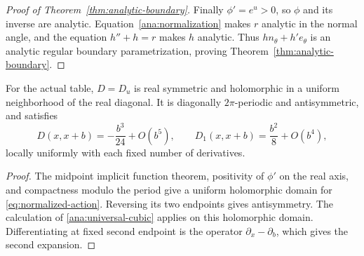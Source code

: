 \begin{proof}[Proof of Theorem~\ref{thm:analytic-boundary}]
Finally \(\phi'=e^u>0\), so \(\phi\) and its inverse are analytic.
Equation~\eqref{ana:normalization} makes \(r\) analytic in the normal
angle, and the equation \(h''+h=r\) makes \(h\) analytic.
Thus \(h n_\theta+h'e_\theta\) is an analytic regular boundary
parametrization, proving Theorem~\ref{thm:analytic-boundary}.
\end{proof}

\begin{corollary}\label{ana:glancing-interface}
For the actual table, \(D=D_u\) is real symmetric and holomorphic
in a uniform neighborhood of the real diagonal.  It is diagonally
\(2\pi\)-periodic and antisymmetric, and satisfies
\begin{equation}\label{ana:glancing-expansion}
 D(x,x+b)=-\frac{b^3}{24}+O(b^5),\qquad
 D_1(x,x+b)=\frac{b^2}{8}+O(b^4),
\end{equation}
locally uniformly with each fixed number of derivatives.
\end{corollary}

\begin{proof}
The midpoint implicit function theorem, positivity of \(\phi'\)
on the real axis, and compactness modulo the period give a uniform
holomorphic domain for \eqref{eq:normalized-action}.  Reversing its
two endpoints gives antisymmetry. The calculation of
\eqref{ana:universal-cubic} applies on this holomorphic domain.
Differentiating at fixed second endpoint is the operator
\(\partial_x-\partial_b\), which gives the second expansion.
\end{proof}
